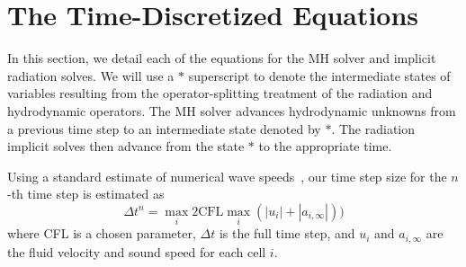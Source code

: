 \documentclass[preprint,12pt]{elsarticle}
\newcommand{\lsec}[1]{\label{sec:#1}}
\begin{document}
\section{The Time-Discretized Equations}\lsec{full}

In this section, we detail each of the equations for the MH solver and implicit radiation solves. We will use a $*$ superscript to denote
the intermediate states of variables resulting from the operator-splitting treatment of the radiation and hydrodynamic operators.  The MH solver advances hydrodynamic unknowns from a previous time step to an intermediate state
denoted by $*$.  The radiation implicit solves then advance from the state $*$ to the appropriate time.

Using a standard estimate of numerical wave speeds~\cite{toro}, our time step size for the $n$-th time
step is estimated as
\begin{equation}\label{eq:cfl}
    \Delta t^n = \max_{i} 2\text{CFL} \max_{i}\left(|u_i| + |a_{i,\infty}|\right))
\end{equation}
where CFL is a chosen parameter, $\Delta t$ is the full time step, and $u_i$ and $a_{i,\infty}$ are the fluid velocity
and sound speed for each cell $i$.

\end{document}
